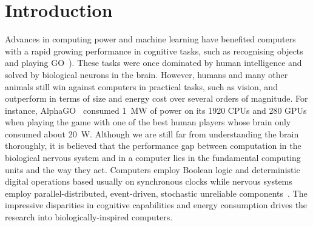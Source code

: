 \chapter{Introduction}
\label{cha:intro}
Advances in computing power and machine learning have benefited computers with a rapid growing performance in cognitive tasks, such as recognising objects~\cite{deng2009imagenet} and playing GO~\cite{silver2016mastering}). 
These tasks were once dominated by human intelligence and solved by biological neurons in the brain.
However, humans and many other animals still win against computers in practical tasks, such as vision, and outperform in terms of size and energy cost over several orders of magnitude.
For instance, AlphaGO~\cite{silver2016mastering} consumed 1~MW of power on its 1920 CPUs and 280 GPUs when playing the game with one of the best human players whose brain only consumed about 20~W.
Although we are still far from understanding the brain thoroughly, it is believed that the performance gap between computation in the biological nervous system and in a computer lies in the fundamental computing units and the way they act.
Computers employ Boolean logic and deterministic digital operations based usually on synchronous clocks while nervous systems employ parallel-distributed, event-driven, stochastic unreliable components~\cite{indiveri2009artificial}.
The impressive disparities in cognitive capabilities and energy consumption drives the research into biologically-inspired computers.



